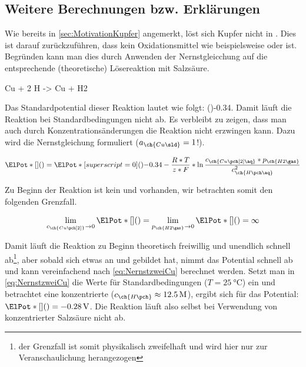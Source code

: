 \documentclass{article}
\begin{document}
    \subsection{Weitere Berechnungen bzw. Erklärungen} \label{sec:Berechneungenweiter}
    
      Wie bereits in \ref{sec:MotivationKupfer} angemerkt, löst sich Kupfer nicht in . Dies ist darauf zurückzuführen, dass  kein Oxidationsmittel wie beispielsweise  oder  ist. Begründen kann man dies durch Anwenden der Nernstgleicchung auf die entsprechende (theoretische) Lösereaktion mit Salzsäure.
      
      \begin{reaction}
        Cu\sld{} + 2 H\pch\aq{} -> Cu\pch[2]\aq{} + H2\gas \label{rec:LosenCuHCl}
      \end{reaction}
      
      Das Standardpotential dieser Reaktion lautet wie folgt: \ElPot[superscript=0](){-0.34}. Damit läuft die Reaktion bei Standardbedingungen nicht ab. Es verbleibt zu zeigen, dass man auch durch Konzentrationsänderungen die Reaktion nicht erzwingen kann. Dazu wird die Nernstgleichung formuliert ($a_{\ch{Cu\sld}} = 1$!).
      
      \begin{equation}
        \ElPot*[](){} = \ElPot*[superscript=0](){-0.34} - \frac{R*T}{z*F} * \ln {\frac{c_{\ch{Cu\pch[2]\aq}}*p_{\ch{H2\gas}}}{c_{\ch{H\pch\aq}}^2}} \label{eq:NernsteinsCu}
      \end{equation}
      
      Zu Beginn der Reaktion ist kein  und  vorhanden, wir betrachten somit den folgenden Grenzfall.
      
      \begin{equation}
        \lim_{c_{\ch{Cu\pch[2]}} \to 0} \ElPot*[](){} = \lim_{p_{\ch{H2\gas}} \to 0} \ElPot*[](){} = \infty
      \end{equation}  
      
      Damit läuft die Reaktion zu Beginn theoretisch freiwillig  und unendlich schnell ab\footnote{der Grenzfall ist somit physikalisch zweifelhaft und wird hier nur zur Veranschaulichung herangezogen}, aber sobald sich etwas an  und  gebildet hat, nimmt das Potential schnell ab und kann vereinfachend nach \eqref{eq:NernstzweiCu} berechnet werden. Setzt man in \eqref{eq:NernstzweiCu} die Werte für Standardbedingungen ($T=\SI[mode=text]{25}{\degreeCelsius}$) ein und betrachtet eine konzentrierte  ($c_{\ch{H\pch}} \approx \SI[mode=text]{12.5}{M}$), ergibt sich für das Potential: $\ElPot*[](){} = \SI[mode=text]{-0.28}{\volt}$. Die Reaktion läuft also selbst bei Verwendung von konzentrierter Salzsäure nicht ab. 
      
\end{document}
